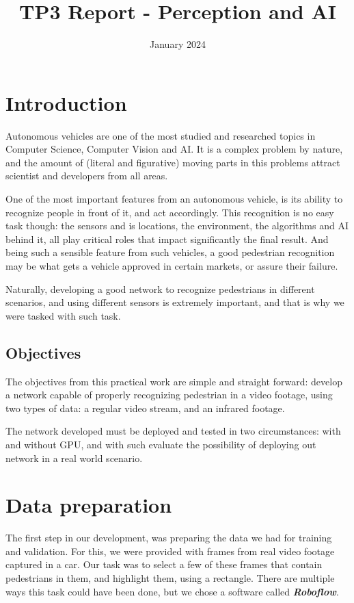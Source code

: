 \documentclass[conference]{IEEEtran}
\title{TP3 Report - Perception and AI}
\author{\IEEEauthorblockN{Bruno Luiz Dias Alves de Castro}
\IEEEauthorblockA{\textit{ESIEE Paris}}
\and
\IEEEauthorblockN{Victor Gabriel Mendes Sündermann}
\IEEEauthorblockA{\textit{ESIEE Paris}}
}
\date{January 2024}
\begin{document}
\maketitle

\section{Introduction}

Autonomous vehicles are one of the most studied and researched topics in Computer Science, Computer Vision and AI. It is a complex problem by nature, and the amount of (literal and figurative) moving parts in this problems attract scientist and developers from all areas.

One of the most important features from an autonomous vehicle, is its ability to recognize people in front of it, and act accordingly. This recognition is no easy task though: the sensors and is locations, the environment, the algorithms and AI behind it, all play critical roles that impact significantly the final result. And being such a sensible feature from such vehicles, a good pedestrian recognition may be what gets a vehicle approved in certain markets, or assure their failure.

Naturally, developing a good network to recognize pedestrians in different scenarios, and using different sensors is extremely important, and that is why we were tasked with such task.

\subsection{Objectives}

The objectives from this practical work are simple and straight forward: develop a network capable of properly recognizing pedestrian in a video footage, using two types of data: a regular video stream, and an infrared footage.

The network developed must be deployed and tested in two circumstances: with and without GPU, and with such evaluate the possibility of deploying out network in a real world scenario.

\section{Data preparation}

The first step in our development, was preparing the data we had for training and validation. For this, we were provided with frames from real video footage captured in a car. Our task was to select a few of these frames that contain pedestrians in them, and highlight them, using a rectangle. There are multiple ways this task could have been done, but we chose a software called \textit{\textbf{Roboflow}}.
\end{document}
